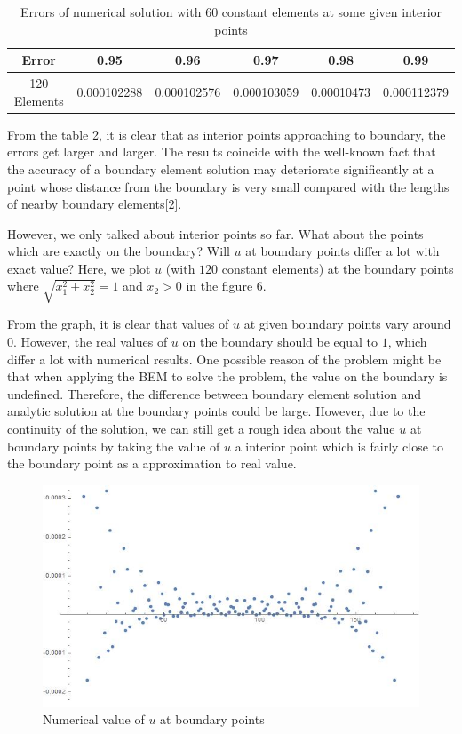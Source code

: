 \documentclass[a4paper,12pt]{article}
\begin{document}
\begin{table}[H]
\centering
\begin{tabular}{@{}cccccc@{}}
\toprule
Error       & 0.95       & 0.96        & 0.97        & 0.98        & 0.99         \\ \midrule
120 Elements & 0.000102288 & 0.000102576 & 0.000103059 & 0.00010473 & 0.000112379 \\ \bottomrule
\end{tabular}
\caption{Errors of numerical solution with $60$ constant elements at some given interior points}
\label{tab:my-table}
\end{table}
\par From the table 2, it is clear that as interior points approaching to boundary, the errors get larger and larger. The results coincide with the well-known fact that the accuracy of a boundary element solution may deteriorate significantly at a point whose distance from the boundary is very small compared with the lengths of nearby boundary elements[2]. 

\par However, we only talked about interior points so far. What about the points which are exactly on the boundary? Will $u$ at boundary points differ a lot with exact value? Here, we plot $u$ (with $120$ constant elements) at the boundary points where $\sqrt{x_1^2+x_2^2} = 1$ and $x_2 > 0$ in the figure 6. 

\par From the graph, it is clear that values of $u$ at given boundary points vary around $0$. However, the real values of $u$ on the boundary should be equal to $1$, which differ a lot with numerical results. One possible reason of the problem might be that when applying the BEM to solve the problem, the value on the boundary is undefined. Therefore, the difference between boundary element solution and analytic solution at the boundary points could be large. However, due to the continuity of the solution, we can still get a rough idea about the value $u$ at boundary points by taking the value of $u$ a interior point which is fairly close to the boundary point as a approximation to real value. 

\begin{figure}[H]
\centering
\includegraphics[scale=0.45]{Boundary.jpg}
\caption{Numerical value of $u$ at boundary points}
\end{figure}
\end{document}
